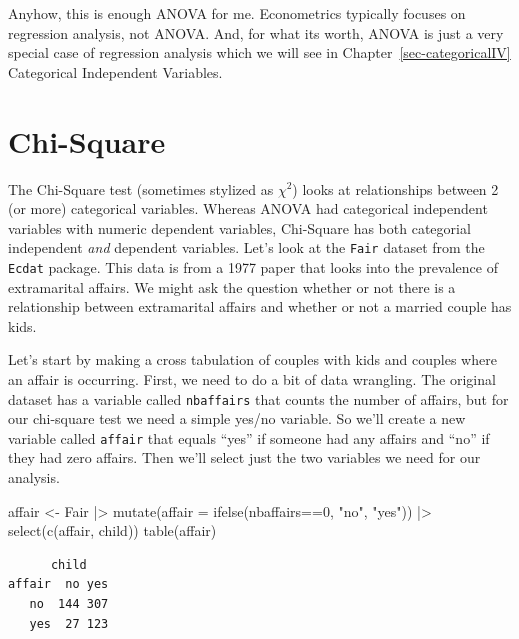 \documentclass[
  letterpaper,
]{book}
\newenvironment{Shaded}{\begin{snugshade}}{\end{snugshade}}
\newcommand{\AttributeTok}[1]{\textcolor[rgb]{0.40,0.45,0.13}{#1}}
\newcommand{\DecValTok}[1]{\textcolor[rgb]{0.68,0.00,0.00}{#1}}
\newcommand{\FunctionTok}[1]{\textcolor[rgb]{0.28,0.35,0.67}{#1}}
\newcommand{\NormalTok}[1]{\textcolor[rgb]{0.00,0.23,0.31}{#1}}
\newcommand{\OtherTok}[1]{\textcolor[rgb]{0.00,0.23,0.31}{#1}}
\newcommand{\SpecialCharTok}[1]{\textcolor[rgb]{0.37,0.37,0.37}{#1}}
\newcommand{\StringTok}[1]{\textcolor[rgb]{0.13,0.47,0.30}{#1}}
\begin{document}
Anyhow, this is enough ANOVA for me. Econometrics typically focuses on
regression analysis, not ANOVA. And, for what its worth, ANOVA is just a
very special case of regression analysis which we will see in
Chapter~\ref{sec-categoricalIV} Categorical Independent Variables.

\section{Chi-Square}\label{chi-square}

The Chi-Square test (sometimes stylized as \(\chi^2\)) looks at
relationships between 2 (or more) categorical variables. Whereas ANOVA
had categorical independent variables with numeric dependent variables,
Chi-Square has both categorial independent \emph{and} dependent
variables. Let's look at the \texttt{Fair} dataset from the
\texttt{Ecdat} package. This data is from a 1977 paper that looks into
the prevalence of extramarital affairs. We might ask the question
whether or not there is a relationship between extramarital affairs and
whether or not a married couple has kids.

Let's start by making a cross tabulation of couples with kids and
couples where an affair is occurring. First, we need to do a bit of data
wrangling. The original dataset has a variable called \texttt{nbaffairs}
that counts the number of affairs, but for our chi-square test we need a
simple yes/no variable. So we'll create a new variable called
\texttt{affair} that equals ``yes'' if someone had any affairs and
``no'' if they had zero affairs. Then we'll select just the two
variables we need for our analysis.

\begin{Shaded}
\begin{Highlighting}[]
\NormalTok{affair }\OtherTok{\textless{}{-}}\NormalTok{ Fair }\SpecialCharTok{|\textgreater{}} 
  \FunctionTok{mutate}\NormalTok{(}\AttributeTok{affair =} \FunctionTok{ifelse}\NormalTok{(nbaffairs}\SpecialCharTok{==}\DecValTok{0}\NormalTok{, }\StringTok{"no"}\NormalTok{, }\StringTok{"yes"}\NormalTok{)) }\SpecialCharTok{|\textgreater{}} 
  \FunctionTok{select}\NormalTok{(}\FunctionTok{c}\NormalTok{(affair, child))}
\FunctionTok{table}\NormalTok{(affair)}
\end{Highlighting}
\end{Shaded}

\begin{verbatim}
      child
affair  no yes
   no  144 307
   yes  27 123
\end{verbatim}
\end{document}
